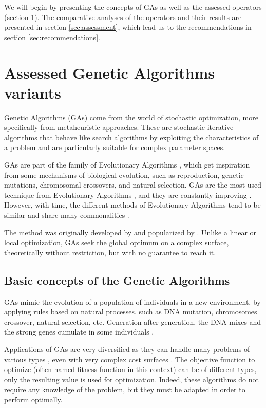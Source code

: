 \documentclass[twocol]{ametsoc}
\begin{document}
We will begin by presenting the concepts of GAs as well as the assessed operators (section \ref{sec:gas}). The comparative analyses of the operators and their results are presented in section \ref{sec:assessment}, which lead us to the recommendations in section \ref{sec:recommendations}.


\section{Assessed Genetic Algorithms variants}
\label{sec:gas}

Genetic Algorithms (GAs) come from the world of stochastic optimization, more specifically from metaheuristic approaches. These are stochastic iterative algorithms that behave like search algorithms by exploiting the characteristics of a problem and are particularly suitable for complex parameter spaces.

GAs are part of the family of Evolutionary Algorithms \citep{Back1993b, Schwefel1993}, which get inspiration from some mechanisms of biological evolution, such as reproduction, genetic mutations, chromosomal crossovers, and natural selection. GAs are the most used technique from Evolutionary Algorithms \citep{Back1993b}, and they are constantly improving \citep{Haupt2004}. However, with time, the different methods of Evolutionary Algorithms tend to be similar and share many commonalities \citep{Back1996b, Haupt2004}.

The method was originally developed by \citet{Holland1992b} and popularized by \citet{Goldberg1989}. Unlike a linear or local optimization, GAs seek the global optimum on a complex surface, theoretically without restriction, but with no guarantee to reach it.


\subsection{Basic concepts of the Genetic Algorithms}

GAs mimic the evolution of a population of individuals in a new environment, by applying rules based on natural processes, such as DNA mutation, chromosomes crossover, natural selection, etc. Generation after generation, the DNA mixes and the strong genes cumulate in some individuals \citep{Beasley1996a}.

Applications of GAs are very diversified as they can handle many problems of various types \citep{Joines1996a}, even with very complex cost surfaces \citep{Haupt2004}. The objective function to optimize (often named fitness function in this context) can be of different types, only the resulting value is used for optimization. Indeed, these algorithms do not require any knowledge of the problem, but they must be adapted in order to perform optimally.
\end{document}

